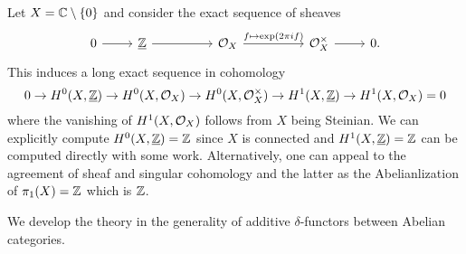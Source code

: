 \begin{example}
    Let $X=\mathbb{C}\setminus\{0\}$ and consider the exact sequence of sheaves 
    $$%
    \begin{tikzcd}
        0 & {\underline{\ZZ}} && {\Ocal_{X}} && {\Ocal_{X}^{\times}} & 0. 
        \arrow[from=1-1, to=1-2]
        \arrow[from=1-2, to=1-4]
        \arrow["{f\mapsto\exp(2\pi i f)}", from=1-4, to=1-6]
        \arrow[from=1-6, to=1-7]
    \end{tikzcd}$$
    This induces a long exact sequence in cohomology 
    $$0\to H^{0}(X,\underline{\mathbb{Z}})\to H^{0}(X,\mathcal{O}_{X})\to H^{0}(X,\mathcal{O}_{X}^{\times})\to H^{1}(X,\underline{\mathbb{Z}})\to H^{1}(X,\mathcal{O}_{X})=0$$
    where the vanishing of $H^{1}(X,\mathcal{O}_{X})$ follows from $X$ being Steinian. We can explicitly compute $H^{0}(X,\underline{\mathbb{Z}})=\mathbb{Z}$ since $X$ is connected and $H^{1}(X,\underline{\mathbb{Z}})=\mathbb{Z}$ can be computed directly with some work. Alternatively, one can appeal to the agreement of sheaf and singular cohomology and the latter as the Abelianlization of $\pi_{1}(X)=\mathbb{Z}$ which is $\mathbb{Z}$. 
\end{example}
We develop the theory in the generality of additive $\delta$-functors between Abelian categories. 
